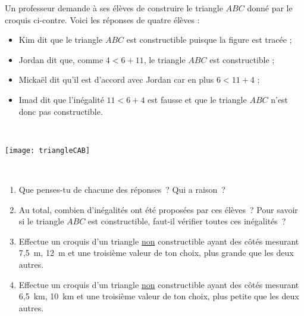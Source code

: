 \begin{activite}
Un professeur demande à ses élèves de construire le triangle $ABC$ donné par le croquis ci-contre. Voici les réponses de quatre élèves : \\[1em]
\begin{minipage}[t]{0.46\textwidth}
\begin{itemize}
 \item Kim dit que le triangle $ABC$ est constructible puisque la figure est tracée ;
 \item Jordan dit que, comme $4 < 6 + 11$,  le triangle $ABC$ est constructible ;
 \item Mickaël dit qu'il est d'accord avec Jordan car en plus $6 < 11 + 4$ ;
 \item Imad dit que l'inégalité $11 < 6 + 4$ est fausse et que le triangle $ABC$ n'est donc pas constructible.
 \end{itemize}
\end{minipage} \hfill%
\begin{minipage}[t]{0.36\textwidth}
\hfill \\
\begin{center} \texttt{[image: triangleCAB]} \end{center}
\end{minipage} \\

\begin{enumerate}
\item Que penses-tu de chacune des réponses ? Qui a raison ?

\item Au total, combien d'inégalités ont été proposées par ces élèves ? Pour savoir si le triangle $ABC$ est constructible, faut-il vérifier toutes ces inégalités ?
   
\item Effectue un croquis d'un triangle \underline{non} constructible ayant des côtés mesurant 7,5 m, 12 m et une troisième valeur de ton choix, plus grande que les deux autres.
         
\item Effectue un croquis d'un triangle \underline{non} constructible ayant des côtés mesurant 6,5 km, 10 km et une troisième valeur de ton choix, plus petite que les deux autres.
\end{enumerate}

\end{activite}



